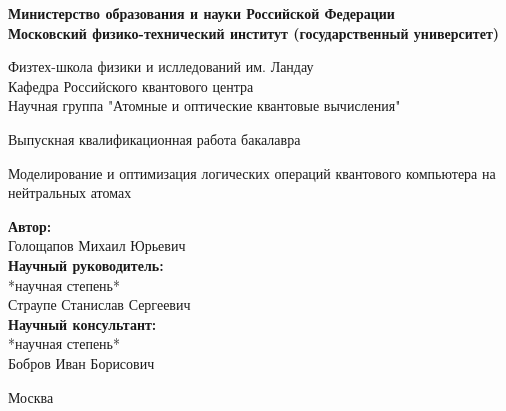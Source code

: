 \begin{center}
    \large\textbf{Министерство образования и науки Российской Федерации \\
    Московский физико-технический институт (государственный
    университет)} \\
    \vspace{1cm}

    Физтех-школа физики и ислледований им. Ландау \\

    Кафедра Российского квантового центра \\
    Научная группа "Атомные и оптические квантовые вычисления"\\

    \vspace{3em}

    Выпускная квалификационная работа бакалавра
\end{center}

\begin{center}
    \vspace{\fill}
    \LARGE{Моделирование и оптимизация логических операций квантового компьютера на нейтральных атомах}

    \vspace{\fill}
\end{center}


\begin{flushright}
    \textbf{Автор:} \\
    Голощапов Михаил Юрьевич \\
    \vspace{2em}
    \textbf{Научный руководитель:} \\
    *научная степень* \\
    Страупе Станислав Сергеевич\\
    \vspace{2em}
    \textbf{Научный консультант:} \\
    *научная степень* \\
    Бобров Иван Борисович \\
\end{flushright}

\vspace{7em}

\begin{center}
    Москва \the\year{}
\end{center}

\thispagestyle{empty}

\newpage
\setcounter{page}{2}
\fancyfoot[c]{\thepage}
\fancyhead[R]{}